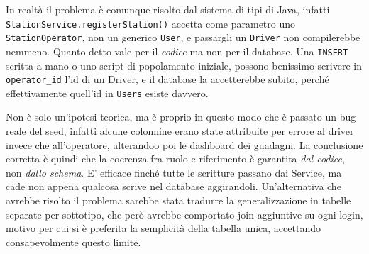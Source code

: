 In realtà il problema è comunque risolto dal sistema di tipi di Java, infatti \texttt{StationService.registerStation()} accetta come parametro uno \texttt{StationOperator}, non un generico \texttt{User}, e passargli un \texttt{Driver} non compilerebbe nemmeno. Quanto detto vale per il \emph{codice} ma non per il database. Una \texttt{INSERT} scritta a mano o uno script di popolamento iniziale, possono benissimo scrivere in \texttt{operator\_id} l'id di un Driver, e il database la accetterebbe subito, perché effettivamente quell'id in \texttt{Users} esiste davvero.

Non è solo un'ipotesi teorica, ma è proprio in questo modo che è passato un bug reale del seed, infatti alcune colonnine erano state attribuite per errore al driver invece che all'operatore, alterandoo poi le dashboard dei guadagni. La conclusione corretta è quindi che la coerenza fra ruolo e riferimento è garantita \emph{dal codice}, non \emph{dallo schema}. E' efficace finché tutte le scritture passano dai Service, ma cade non appena qualcosa scrive nel database aggirandoli. Un'alternativa che avrebbe risolto il problema sarebbe stata tradurre la generalizzazione in tabelle separate per sottotipo, che però avrebbe comportato join aggiuntive su ogni login, motivo per cui si è preferita la semplicità della tabella unica, accettando consapevolmente questo limite.